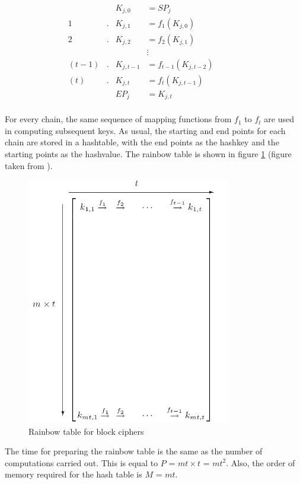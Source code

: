 \begin{align*}
& & K_{j,0} & = SP_j & & & &\\
1&. &K_{j,1} & = f_1(K_{j,0}) & & & &\\
2&. &K_{j,2} & = f_2(K_{j,1}) & & & &\\
& & &\vdots & & & &\\
(t-1)&. &K_{j,t-1} & = f_{t-1}(K_{j,t-2}) & & & &\\
(t)&. &K_{j,t} & = f_t(K_{j,t-1}) & & & &\\
& & EP_j & = K_{j,t} & & & &\\
\end{align*}

For every chain, the same sequence of mapping functions from $f_1$ to $f_t$ are used in computing subsequent keys. As usual, the starting and end points for each chain are stored in a hashtable, with the end points as the hashkey and the starting points as the hashvalue. The rainbow table is shown in figure \ref{fig:rainbow-table} (figure taken from \cite{oechslin:mfc}).

\begin{figure}[ht!]
	\centering
		\includegraphics[width=3.5in]{./figures/rainbow-table.PNG}
	\caption{Rainbow table for block ciphers \cite{oechslin:mfc}}	
	\label{fig:rainbow-table}
\end{figure}

The time for preparing the rainbow table is the same as the number of computations carried out. This is equal to $P$ = $mt \times t$ = $mt^2$. Also, the order of memory required for the hash table is $M$ = $mt$. \\

